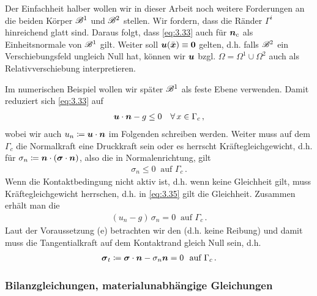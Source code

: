 Der Einfachheit halber wollen wir in dieser Arbeit noch weitere Forderungen an die beiden Körper $\mathscr B^1$ und $\mathscr B^2$ stellen. Wir fordern, dass die Ränder $\Gamma^i$ hinreichend glatt sind. Daraus folgt, dass \eqref{eq:3.33}  auch für $\boldsymbol n_c$ als Einheitsnormale von $\mathscr B^1$ gilt. Weiter soll $\boldsymbol u(\bar{\boldsymbol x})\equiv \boldsymbol 0$ gelten, d.h. falls $\mathscr B^2$ ein Verschiebungsfeld ungleich Null hat, können wir $\boldsymbol u$ bzgl. $\Omega = \Omega^1\cup\Omega^2$ auch als Relativverschiebung interpretieren.


Im numerischen Beispiel wollen wir später $\mathscr B^1$ als feste Ebene verwenden. Damit reduziert sich \eqref{eq:3.33} auf
\begin{align}\label{eq:3.34}
	\boldsymbol u \cdot \boldsymbol n - g \le 0 \quad \forall \, x \in \Gamma_c \, ,
\end{align}
wobei wir auch $u_n \coloneqq \boldsymbol u \cdot \boldsymbol n$ im Folgenden schreiben werden. Weiter muss auf dem  $\Gamma_c$ die Normalkraft eine Druckkraft sein oder es herrscht Kräftegleichgewicht, d.h. für  $\sigma_n \coloneqq \boldsymbol n\cdot (\boldsymbol \sigma\cdot \boldsymbol n)$, also die  in Normalenrichtung, gilt
\begin{align}\label{eq:3.35}
	\sigma_n \le 0  \ \text{ auf }  \Gamma_c \, .
\end{align}
Wenn die Kontaktbedingung nicht aktiv ist, d.h. wenn keine Gleichheit gilt, muss Kräftegleichgewicht herrschen, d.h. in \eqref{eq:3.35} gilt die Gleichheit. Zusammen erhält man die \textit{}
\begin{align}\label{eq:3.36}
	(u_n - g )\,   \sigma_n = 0 \ \text{ auf } \Gamma_c \, .
\end{align}
Laut der Voraussetzung (e) betrachten wir den  (d.h. keine Reibung) und damit muss die Tangentialkraft auf dem Kontaktrand gleich Null sein, d.h.
\begin{align}\label{eq:3.37}
	\bs \sigma_t \coloneqq \bs \sigma \cdot \bs n - \sigma_n \bs n = 0 \ \text{ auf } \Gamma_c \, .
\end{align}



\subsubsection{Bilanzgleichungen, materialunabhängige Gleichungen}


